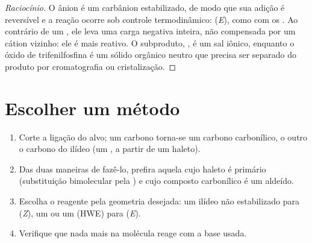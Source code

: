 \begin{proof}[Raciocínio]
O ânion  é um carbânion estabilizado, de modo que sua adição é reversível e a reação ocorre
sob controle termodinâmico: (\textit{E}), como com os . Ao contrário de um , ele leva uma carga negativa inteira, não compensada por um cátion vizinho: ele é mais
reativo. O subproduto, , é um sal iônico, enquanto o óxido de trifenilfosfina é um
sólido orgânico neutro que precisa ser separado do produto por cromatografia ou cristalização.
\end{proof}

\section{Escolher um método}

\begin{method}\label{met:b2:wittig:wittig-disconnection}
\begin{enumerate}
  \item Corte a ligação  do alvo; um carbono torna-se um carbono carbonílico, o outro o carbono
        do ilídeo (um , a partir de um haleto).
  \item Das duas maneiras de fazê-lo, prefira aquela cujo haleto é primário (substituição bimolecular
        pela ) e cujo composto carbonílico é um aldeído.
  \item Escolha o reagente pela geometria desejada: um ilídeo não estabilizado para (\textit{Z}), um
         ou um  (HWE) para (\textit{E}).
  \item Verifique que nada mais na molécula reage com a base usada.
\end{enumerate}
\end{method}

